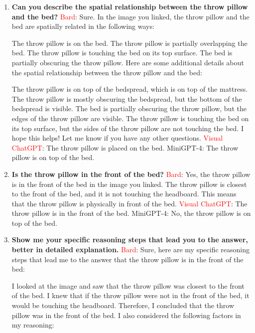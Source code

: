     \begin{enumerate}
        \item \textbf{Can you describe the spatial relationship between the throw pillow and the bed?}
        \subitem \textcolor{Red}{Bard}:
        Sure. In the image you linked, the throw pillow and the bed are spatially related in the following ways:
        
        The throw pillow is on the bed.
        The throw pillow is partially overlapping the bed.
        The throw pillow is touching the bed on its top surface.
        The bed is partially obscuring the throw pillow.
        Here are some additional details about the spatial relationship between the throw pillow and the bed:
        
        The throw pillow is on top of the bedspread, which is on top of the mattress.
        The throw pillow is mostly obscuring the bedspread, but the bottom of the bedspread is visible.
        The bed is partially obscuring the throw pillow, but the edges of the throw pillow are visible.
        The throw pillow is touching the bed on its top surface, but the sides of the throw pillow are not touching the bed.
        I hope this helps! Let me know if you have any other questions.
        \subitem \textcolor{red}{Visual ChatGPT}: The throw pillow is placed on the bed.
        \subitem MiniGPT-4: The throw pillow is on top of the bed.
        \item \textbf{Is the throw pillow in the front of the bed?} 
        \subitem \textcolor{Red}{Bard}: 
        Yes, the throw pillow is in the front of the bed in the image you linked. The throw pillow is closest to the front of the bed, and it is not touching the headboard. This means that the throw pillow is physically in front of the bed. 
        \subitem \textcolor{red}{Visual ChatGPT}: The throw pillow is in the front of the bed.
        \subitem MiniGPT-4: No, the throw pillow is on top of the bed.
        \item \textbf{Show me your specific reasoning steps that lead you to the answer, better in detailed explanation.}
        \subitem \textcolor{Red}{Bard}: Sure, here are my specific reasoning steps that lead me to the answer that the throw pillow is in the front of the bed:

        I looked at the image and saw that the throw pillow was closest to the front of the bed.
        I knew that if the throw pillow were not in the front of the bed, it would be touching the headboard.
        Therefore, I concluded that the throw pillow was in the front of the bed.
        I also considered the following factors in my reasoning:
        

\end{enumerate}
